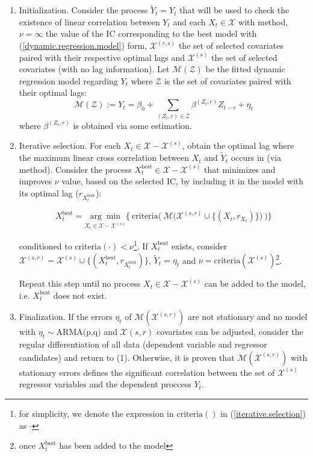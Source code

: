 \documentclass[a4paper]{easychair}
\begin{document}
\begin{enumerate}
    \item Initialization. Consider the process $\tilde{Y}_t=Y_t$ that will be used to check the existence of linear correlation between $Y_t$ and each $X_t\in \mathcal{X}$ with \cite{cryer2008time} method, $\nu=\infty$ the value of the IC corresponding to the best model with (\ref{dynamic.regression.model}) form, $\mathcal{X}^{(r,s)}$ the set of selected covariates paired with their respective optimal lags and $\mathcal{X}^{(s)}$ the set of selected covariates (with no lag information). Let $\mathcal{M}(\mathcal{Z})$ be the fitted dynamic regression model regarding $Y_t$ where $\mathcal{Z}$ is the set of covariates paired with their optimal lags:
    \[ \mathcal{M}(\mathcal{Z}) := Y_t = \beta_0 + \sum_{(Z_t, r)\in\mathcal{Z}} \beta^{(Z_t, r)} Z_{t-r} + \eta_t\]
    \noindent where $\beta^{(Z_t, r)}$ is obtained via some estimation.

    \item Iterative selection. For each $X_t\in\mathcal{X}-\mathcal{X}^{(s)}$, obtain the optimal lag where the maximum linear cross correlation between $X_t$ and $\tilde{Y}_t$ occurs in (via \cite{cryer2008time} method). Consider the process $X_t^\text{best}\in\mathcal{X}-\mathcal{X}^{(s)}$ that minimizes and improves $\nu$ value, based on the selected IC, by including it in the model with its optimal lag ($r_{X_t^\text{best}}$):
    
    \begin{equation}\label{iterative.selection}
        X^\text{best}_t =  \underset{X_t\in\mathcal{X}-\mathcal{X}^{(s)}}{\arg\min} \Bigg\{ \ \text{criteria}\Bigg(\ \mathcal{M}\Big(\mathcal{X}^{(s,r)} \cup \big\{(X_t, r_{X_t})\big\} \Big) \ \Bigg) \Bigg\}
    \end{equation}

    \noindent conditioned to $\text{criteria}(\cdot) < \nu$\footnote{for simplicity, we denote the expression in $\text{criteria}()$ in (\ref{iterative.selection}) as $\cdot$}. 
    If $X^{\text{best}}_t$ exists, consider $\mathcal{X}^{(s,r)} = \mathcal{X}^{(s)}  \cup \{(X_t^\text{best}, r_{X_t^\text{best}})\}$, $\tilde{Y}_t = \eta_t$ and $\nu=\text{criteria}(\mathcal{X}^{(s)})$\footnote{once $X_t^\text{best}$ has been added to the model }.
    
    Repeat this step until no process $X_t\in\mathcal{X}-\mathcal{X}^{(s)}$ can be added to the model, i.e. $X_t^\text{best}$ does not exist.


    \item Finalization. If the errors $\eta_t$ of $\mathcal{M}(\mathcal{X}^{(s,r)})$ are not stationary and no model with $\eta_t\sim\text{ARMA(p,q)}$ and $\mathcal{X}(s,r)$ covariates can be adjusted, consider the regular differentiation of all data (dependent variable and regressor candidates) and return to (1). Otherwise, it is proven that  $\mathcal{M}(\mathcal{X}^{(s,r)})$ with stationary errors defines the significant correlation between the set of $\mathcal{X}^{(s)}$ regressor variables and the dependent proccess $Y_t$.
\end{enumerate}
\end{document}
